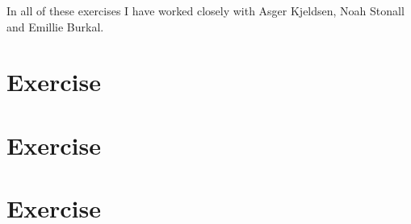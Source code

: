 \documentclass[a4paper]{article}
\begin{document}
\maketitle

\newpage
\tableofcontents
\newpage

In all of these exercises I have worked closely with Asger Kjeldsen, Noah Stonall and Emillie Burkal.
\section{Exercise}
\subsection{}

\subsection{}

\subsection{}


\section{Exercise}
\subsection{}


\section{Exercise}
\subsection{}

\subsection{}

\subsection{}

\end{document}
